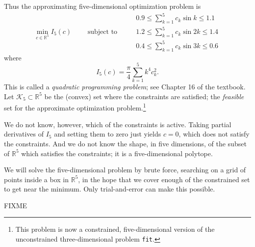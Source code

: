 \documentclass[11pt]{amsart}
\newcommand{\mfile}[2]{\bigskip
\begin{quote}
\VerbatimInput[frame=single,framesep=3mm,label=\fbox{\normalsize \textsl{\,#2\,}},fontfamily=courier,fontsize=\scriptsize]{#1}
\end{quote}
}
\newcommand{\RR}{\mathbb{R}}
\begin{document}
Thus the approximating five-dimensional optimization problem is
    $$\min_{c \in \RR^5} I_5(c) \qquad \text{ subject to } \qquad \begin{matrix}
    0.9 \le \sum_{k=1}^5 c_k \sin k   \le 1.1 \\
    1.2 \le \sum_{k=1}^5 c_k \sin 2 k \le 1.4 \\
    0.4 \le \sum_{k=1}^5 c_k \sin 3 k \le 0.6
    \end{matrix}$$
where
    $$I_5(c) = \frac{\pi}{4} \sum_{k=1}^5 k^4 c_k^2.$$
This is called a \emph{quadratic programming problem}; see Chapter 16 of the textbook.  Let $\mathcal{K}_5 \subset \RR^5$ be the (convex) set where the constraints are satisfied; the \emph{feasible} set for the approximate optimization problem.\footnote{This problem is now a constrained, five-dimensional version of the unconstrained three-dimensional problem \texttt{fit}.}

We do not know, however, which of the constraints is active.  Taking partial derivatives of $I_5$ and setting them to zero just yields $c=0$, which does not satisfy the constraints.  And we do not know the shape, in five dimensions, of the subset of $\RR^5$ which satisfies the constraints; it is a five-dimensional polytope.

We will solve the five-dimensional problem by brute force, searching on a grid of points inside a box in $\RR^5$, in the hope that we cover enough of the constrained set to get near the minimum.  Only trial-and-error can make this possible.  

FIXME

\bigskip

\mfile{matlab/beam.m}{beam.m}
\end{document}
